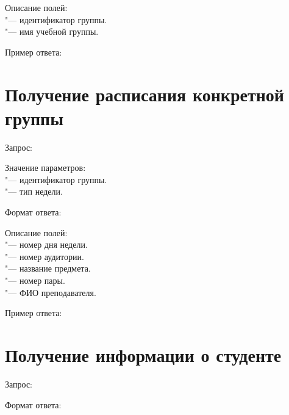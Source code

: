 Описание полей:\\
 "--- идентификатор группы.\\
 "--- имя учебной группы.

Пример ответа:
\begin{listing}[H]
\end{listing}
\vspace{-0.75cm}

\section{Получение расписания конкретной группы}
\label{sec:group}

Запрос: 

Значение параметров:\\
 "--- идентификатор группы.\\
 "--- тип недели.

Формат ответа:
\begin{listing}[H]
\end{listing}
\vspace{-0.75cm}

Описание полей:\\
 "--- номер дня недели.\\
 "--- номер аудитории.\\
 "--- название предмета.\\
 "--- номер пары.\\
 "--- ФИО преподавателя.

Пример ответа:
\begin{listing}[H]
\end{listing}
\vspace{-0.75cm}

\section{Получение информации о студенте}
\label{sec:student}

Запрос: 

Формат ответа:
\begin{listing}[H]
\end{listing}
\vspace{-0.75cm}

